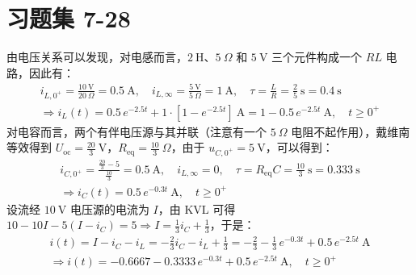\documentclass[UTF8]{report}
\theoremstyle{MyLineTheoremStyle} %
\theoremstyle{MyBlockTheoremStyle} %
\theoremstyle{MySubsubsectionStyle} %
\begin{document}
\section{习题集 7-28}
由电压关系可以发现，对电感而言，$2 \ \mathrm{H}$、$5 \ \Omega$ 和 $5 \ \mathrm{V}$ 三个元件构成一个 $RL$ 电路，因此有：
\begin{gather}
    i_{L,0^+} = \frac{10 \ \mathrm{V}}{20 \ \Omega} = 0.5 \ \mathrm{A},\quad i_{L,\infty} = \frac{5 \ \mathrm{V}}{5 \ \Omega} = 1 \ \mathrm{A},\quad \tau = \frac{L}{R} = \frac{2}{5} \ \mathrm{s} =  0.4 \ \mathrm{s} \\ 
    \Longrightarrow 
    i_L(t) = 0.5\, e^{ - 2.5 t} + 1\cdot \left[1 - e^{ - 2.5 t}\right] \ \mathrm{A} = 1 - 0.5 \,e^{ - 2.5 t} \ \mathrm{A},\quad t \geqslant 0^+
\end{gather}
对电容而言，两个有伴电压源与其并联（注意有一个 $5 \ \Omega$ 电阻不起作用），戴维南等效得到 $U_{\text{oc}} = \frac{20}{3} \ \mathrm{V}$，$R_{\text{eq}} = \frac{10}{3} \ \Omega$，由于 $u_{C,0^+} = 5 \ \mathrm{V}$，可以得到：
\begin{gather}
    i_{C,0^+} = \frac{\frac{20}{3} - 5}{\frac{10}{3}} = 0.5 \ \mathrm{A}
    ,\quad 
    i_{L,\infty} = 0
    ,\quad 
    \tau = R_{\text{eq}}C = \frac{10}{3} \ \mathrm{s} =  0.333 \ \mathrm{s} \\ 
    \Longrightarrow 
    i_C(t) = 0.5 \,e^{ -0.3t} \ \mathrm{A},\quad t \geqslant 0^+
\end{gather}
设流经 $10 \ \mathrm{V}$ 电压源的电流为 $I$，由 KVL 可得 $10 - 10 I - 5(I - i_C) = 5 \Longrightarrow I = \frac{1}{3}i_C + \frac{1}{3}$，于是：
\begin{gather}
i(t) = I - i_C - i_L = -\frac{2}{3}i_C - i_L + \frac{1}{3} = 
- \frac{2}{3} - \frac{1}{3}\,e^{-0.3 t} + 0.5\,e^{-2.5 t} \ \mathrm{A}\\ 
\Longrightarrow 
\boxed{
    i(t) = -0.6667 - 0.3333\,e^{-0.3 t} + 0.5\,e^{-2.5 t} \ \mathrm{A},\quad t \geqslant 0^+
}
\end{gather}
\end{document}
